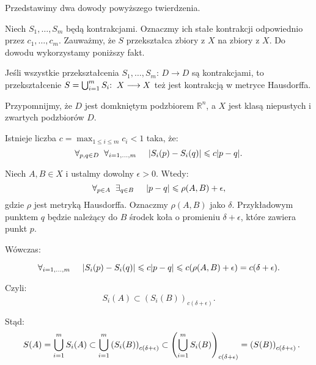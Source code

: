 \documentclass{mini}
\begin{document}
Przedstawimy dwa dowody powyższego twierdzenia.

\begin{dow1}

Niech $S_1,\ldots ,S_m$ będą kontrakcjami. Oznaczmy ich stałe kontrakcji odpowiednio przez $c_1,\ldots,c_m$. Zauważmy, że $S$ przekształca zbiory z $X$ na zbiory z $X$. Do dowodu wykorzystamy poniższy fakt.

\begin{lem}\label{tp1}
Jeśli wszystkie przekształcenia $S_1,\ldots ,S_m$: $D \longrightarrow D$ są kontrakcjami, to
przekształcenie $S=\bigcup^{m}_{i=1} S_i \textrm{:} \hspace{2mm} X\longrightarrow X$ też jest kontrakcją w metryce Hausdorffa. 
\end{lem}

\begin{dow}

Przypomnijmy, że $D$ jest domkniętym podzbiorem $\mathbb{R}^n$, a $X$ jest klasą niepustych i zwartych podzbiorów $D$.

Istnieje liczba $c=\max_{1\leqslant i\leqslant m}{c_i}<1$ taka, że:
$$ 
\forall_{p,q \in D} \hspace{2mm} \forall_{i=1,\ldots ,m} \hspace{5mm} \vert S_i(p)-S_i(q)\vert \leqslant c \vert p-q \vert. 
$$

Niech $A,B \in X$ i ustalmy dowolny $\epsilon>0$. Wtedy:
$$ 
\forall_{p \in A} \hspace{2mm} \exists_{q \in B} \hspace{5mm} \vert p-q \vert \leqslant \rho(A,B)+\epsilon,
$$
gdzie $\rho$ jest metryką Hausdorffa. Oznaczmy $\rho(A,B)$ jako $\delta$. Przykładowym punktem $q$ będzie należący do $B$ środek koła o promieniu $\delta+\epsilon$, które zawiera punkt $p$. 

Wówczas:

$$
\forall_{i=1,\ldots ,m} \hspace{5mm} \vert S_i(p)-S_i(q) \vert \leqslant c \vert p-q \vert \leqslant c(\rho(A,B)+\epsilon)=c(\delta+\epsilon).
$$

Czyli: 
$$
S_i(A) \subset \left(S_i(B)\right)_{c(\delta+\epsilon)}.
$$

Stąd: 
$$ 
\hspace{2mm} S(A)=\bigcup^{m}_{i=1} S_i(A) \subset \bigcup^{m}_{i=1} \left(S_i(B)\right)_{c(\delta+\epsilon)} \subset \left(\bigcup^{m}_{i=1} S_i(B)\right)_{c(\delta+\epsilon)} = \left(S(B)\right)_{c(\delta+\epsilon)}.  
$$


\end{dow}
\end{dow1}
\end{document}
